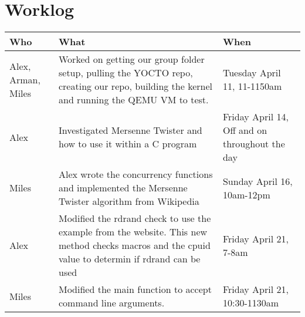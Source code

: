 \documentclass[letterpaper,10pt,draftclsnofoot,onecolumn]{IEEEtran}
\begin{document}
\section{Worklog}
\begin{tabular}{| p{2.1in} | p{2.3in} | p{2.1in} |}
\hline
Who & What & When \\
\hline
Alex, Arman, Miles & Worked on getting our group folder setup, pulling the YOCTO repo, creating our repo, building the kernel and running the QEMU VM to test. & Tuesday April 11, 11-1150am\\
\hline
Alex & Investigated Mersenne Twister and how to use it within a C program & Friday April 14, Off and on throughout the day\\
\hline
Miles & Alex wrote the concurrency functions and implemented the Mersenne Twister algorithm from Wikipedia & Sunday April 16, 10am-12pm\\
\hline
Alex & Modified the rdrand check to use the example from the website. This new method checks macros and the cpuid value to determin if rdrand can be used & Friday April 21, 7-8am \\
\hline
Miles & Modified the main function to accept command line arguments. & Friday April 21, 10:30-1130am \\

\hline

\end{tabular}



%
\end{document}

